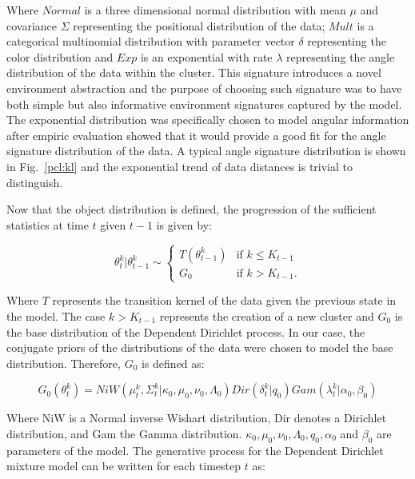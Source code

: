 \documentclass[twoside,hidelinks]{article}
\begin{document}
Where $Normal$ is a three dimensional normal distribution with mean $\mu$ and covariance $\Sigma$ representing the positional distribution of the data; $Mult$ is a categorical multinomial distribution with parameter vector $\delta$ representing the color distribution and $Exp$ is an exponential with rate $\lambda$ representing the angle distribution of the data within the cluster. This signature introduces a novel environment abstraction and the purpose of choosing such signature was to have both simple but also informative environment signatures captured by the model. The exponential distribution was specifically chosen to model angular information after empiric evaluation showed that it would provide a good fit for the angle signature distribution of the data. A typical angle signature distribution is shown in Fig.~\ref{pcl:kl} and the exponential trend of data distances is trivial to distinguish.

Now that the object distribution is defined, the progression of the sufficient statistics at time $t$ given $t-1$ is given by:

   \begin{center}
\begin{equation}
    \theta_t^k | \theta_{t-1}^k \sim
   \begin{cases} T (\theta_{t-1}^k) &\mbox{if } k \leq K_{t-1} \\
   G_0 & \mbox{if } k > K_{t-1}. \end{cases}
\end{equation}
   \end{center}
Where $T$ represents the transition kernel of the data given the previous state in the model. The case $ k > K_{t-1} $ represents the creation of a new cluster and $G_0$ is the base distribution of the Dependent Dirichlet process. In our case, the conjugate priors of the distributions of the data were chosen to model the base distribution. Therefore, $G_0$ is defined as:

\begin{equation}
 G_0(\theta_t^k)  = NiW( \mu_t^k, \Sigma_t^k | \kappa_0, \mu_0, \nu_0, \Lambda_0 ) Dir(\delta_t^k | q_0) Gam( \lambda_t^k | \alpha_0, \beta_0)
 \end{equation}

Where NiW is a Normal inverse Wishart distribution, Dir denotes a Dirichlet distribution, and Gam the Gamma distribution. $ \kappa_0, \mu_0, \nu_0, \Lambda_0, q_0,\alpha_0$ and $\beta_0$ are parameters of the model. The generative process for the Dependent Dirichlet mixture model can be written for each timestep $t$ as:
\end{document}
